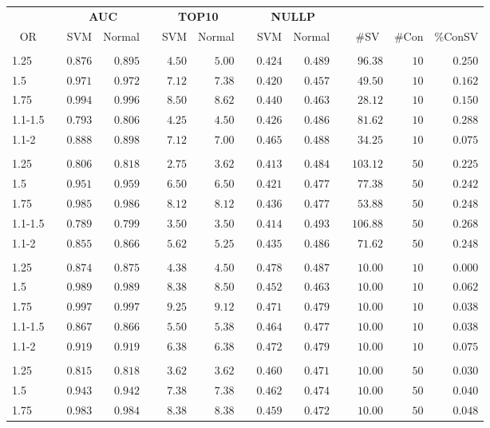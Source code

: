 \documentclass{article}\usepackage[]{graphicx}\usepackage[]{color}
\begin{document}
\begin{table}[H]
\begin{center}
\begin{tabular}{lcrrcrrcrrcrrr}
\hline\hline
\multicolumn{1}{c}{\bfseries }&\multicolumn{1}{c}{\bfseries }&\multicolumn{2}{c}{\bfseries AUC}&\multicolumn{1}{c}{\bfseries }&\multicolumn{2}{c}{\bfseries TOP10}&\multicolumn{1}{c}{\bfseries }&\multicolumn{2}{c}{\bfseries NULLP}&\multicolumn{1}{c}{\bfseries }&\multicolumn{3}{c}{\bfseries }\tabularnewline
\cline{1-14}
\multicolumn{1}{c}{OR}&\multicolumn{1}{c}{}&\multicolumn{1}{c}{SVM}&\multicolumn{1}{c}{Normal}&\multicolumn{1}{c}{}&\multicolumn{1}{c}{SVM}&\multicolumn{1}{c}{Normal}&\multicolumn{1}{c}{}&\multicolumn{1}{c}{SVM}&\multicolumn{1}{c}{Normal}&\multicolumn{1}{c}{}&\multicolumn{1}{c}{\#SV}&\multicolumn{1}{c}{\#Con}&\multicolumn{1}{c}{\%ConSV}\tabularnewline
\hline
&&&&&&&&&&&&&\tabularnewline
1.25&&$0.876$&$0.895$&&$4.50$&$5.00$&&$0.424$&$0.489$&&$ 96.38$&$10$&$0.250$\tabularnewline
1.5&&$0.971$&$0.972$&&$7.12$&$7.38$&&$0.420$&$0.457$&&$ 49.50$&$10$&$0.162$\tabularnewline
1.75&&$0.994$&$0.996$&&$8.50$&$8.62$&&$0.440$&$0.463$&&$ 28.12$&$10$&$0.150$\tabularnewline
1.1-1.5&&$0.793$&$0.806$&&$4.25$&$4.50$&&$0.426$&$0.486$&&$ 81.62$&$10$&$0.288$\tabularnewline
1.1-2&&$0.888$&$0.898$&&$7.12$&$7.00$&&$0.465$&$0.488$&&$ 34.25$&$10$&$0.075$\tabularnewline
\hline
&&&&&&&&&&&&&\tabularnewline
1.25&&$0.806$&$0.818$&&$2.75$&$3.62$&&$0.413$&$0.484$&&$103.12$&$50$&$0.225$\tabularnewline
1.5&&$0.951$&$0.959$&&$6.50$&$6.50$&&$0.421$&$0.477$&&$ 77.38$&$50$&$0.242$\tabularnewline
1.75&&$0.985$&$0.986$&&$8.12$&$8.12$&&$0.436$&$0.477$&&$ 53.88$&$50$&$0.248$\tabularnewline
1.1-1.5&&$0.789$&$0.799$&&$3.50$&$3.50$&&$0.414$&$0.493$&&$106.88$&$50$&$0.268$\tabularnewline
1.1-2&&$0.855$&$0.866$&&$5.62$&$5.25$&&$0.435$&$0.486$&&$ 71.62$&$50$&$0.248$\tabularnewline
\hline
&&&&&&&&&&&&&\tabularnewline
1.25&&$0.874$&$0.875$&&$4.38$&$4.50$&&$0.478$&$0.487$&&$ 10.00$&$10$&$0.000$\tabularnewline
1.5&&$0.989$&$0.989$&&$8.38$&$8.50$&&$0.452$&$0.463$&&$ 10.00$&$10$&$0.062$\tabularnewline
1.75&&$0.997$&$0.997$&&$9.25$&$9.12$&&$0.471$&$0.479$&&$ 10.00$&$10$&$0.038$\tabularnewline
1.1-1.5&&$0.867$&$0.866$&&$5.50$&$5.38$&&$0.464$&$0.477$&&$ 10.00$&$10$&$0.038$\tabularnewline
1.1-2&&$0.919$&$0.919$&&$6.38$&$6.38$&&$0.472$&$0.479$&&$ 10.00$&$10$&$0.075$\tabularnewline
\hline
&&&&&&&&&&&&&\tabularnewline
1.25&&$0.815$&$0.818$&&$3.62$&$3.62$&&$0.460$&$0.471$&&$ 10.00$&$50$&$0.030$\tabularnewline
1.5&&$0.943$&$0.942$&&$7.38$&$7.38$&&$0.462$&$0.474$&&$ 10.00$&$50$&$0.040$\tabularnewline
1.75&&$0.983$&$0.984$&&$8.38$&$8.38$&&$0.459$&$0.472$&&$ 10.00$&$50$&$0.048$\tabularnewline

\end{tabular}
\end{center}
\end{table}
\end{document}
